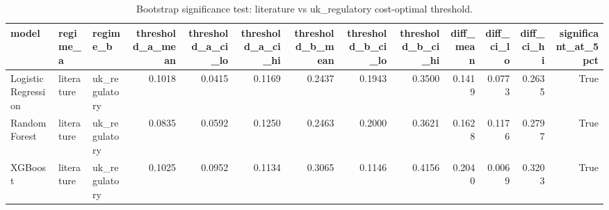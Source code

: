 \begin{table}
\caption{Bootstrap significance test: literature vs uk_regulatory cost-optimal threshold.}
\label{tab:table11_bootstrap_significance}
\begin{tabular}{lllrrrrrrrrrr}
\toprule
model & regime\_a & regime\_b & threshold\_a\_mean & threshold\_a\_ci\_lo & threshold\_a\_ci\_hi & threshold\_b\_mean & threshold\_b\_ci\_lo & threshold\_b\_ci\_hi & diff\_mean & diff\_ci\_lo & diff\_ci\_hi & significant\_at\_5pct \\
\midrule
Logistic Regression & literature & uk\_regulatory & 0.1018 & 0.0415 & 0.1169 & 0.2437 & 0.1943 & 0.3500 & 0.1419 & 0.0773 & 0.2635 & True \\
Random Forest & literature & uk\_regulatory & 0.0835 & 0.0592 & 0.1250 & 0.2463 & 0.2000 & 0.3621 & 0.1628 & 0.1176 & 0.2797 & True \\
XGBoost & literature & uk\_regulatory & 0.1025 & 0.0952 & 0.1134 & 0.3065 & 0.1146 & 0.4156 & 0.2040 & 0.0069 & 0.3203 & True \\
\bottomrule
\end{tabular}
\end{table}
